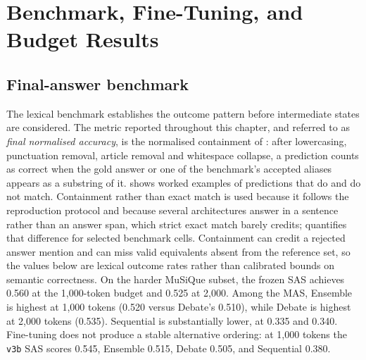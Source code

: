\chapter{Benchmark, Fine-Tuning, and Budget Results}
\label{chap:benchmark-results}

\section{Final-answer benchmark}

The lexical benchmark establishes the outcome pattern before intermediate states are considered. The metric reported throughout this chapter, and referred to as \emph{final normalised accuracy}, is the normalised containment of : after lowercasing, punctuation removal, article removal and whitespace collapse, a prediction counts as correct when the gold answer or one of the benchmark's accepted aliases appears as a substring of it.  shows worked examples of predictions that do and do not match. Containment rather than exact match is used because it follows the reproduction protocol and because several architectures answer in a sentence rather than an answer span, which strict exact match barely credits;  quantifies that difference for selected benchmark cells. Containment can credit a rejected answer mention and can miss valid equivalents absent from the reference set, so the values below are lexical outcome rates rather than calibrated bounds on semantic correctness. On the harder MuSiQue subset, the frozen SAS achieves 0.560 at the 1,000-token budget and 0.525 at 2,000. Among the MAS, Ensemble is highest at 1,000 tokens (0.520 versus Debate's 0.510), while Debate is highest at 2,000 tokens (0.535). Sequential is substantially lower, at 0.335 and 0.340. Fine-tuning does not produce a stable alternative ordering: at 1,000 tokens the \texttt{v3b} SAS scores 0.545, Ensemble 0.515, Debate 0.505, and Sequential 0.380.

